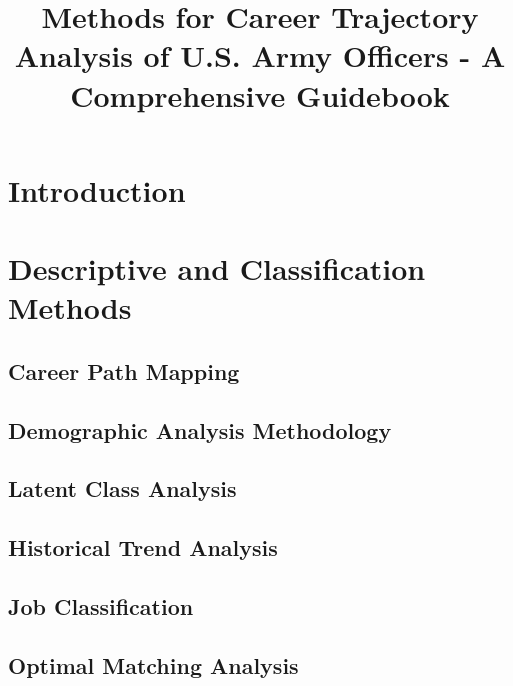 \documentclass[12pt,a4paper]{article}
\title{Methods for Career Trajectory Analysis of U.S. Army Officers - A Comprehensive Guidebook}
\author{}
\date{}
\begin{document}
\maketitle

\tableofcontents

\doublespacing

\newpage
\section{Introduction}


\newpage
\section{Descriptive and Classification Methods}


\subsection{Career Path Mapping}


\subsection{Demographic Analysis Methodology}


\subsection{Latent Class Analysis}


\subsection{Historical Trend Analysis}


\subsection{Job Classification}


\subsection{Optimal Matching Analysis}

\end{document}
